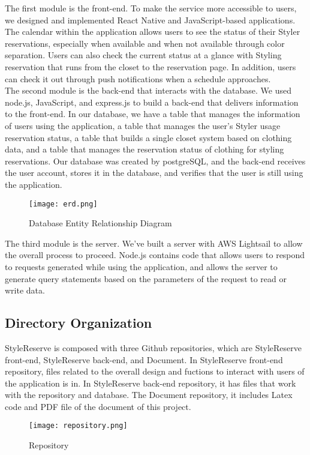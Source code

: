 \documentclass[conference]{IEEEtran}
\begin{document}
The first module is the front-end. To make the service more accessible to users, we designed and implemented React Native and JavaScript-based applications. The calendar within the application allows users to see the status of their Styler reservations, especially when available and when not available through color separation. Users can also check the current status at a glance with Styling reservation that runs from the closet to the reservation page. In addition, users can check it out through push notifications when a schedule approaches.\\
The second module is the back-end that interacts with the database. We used node.js, JavaScript, and express.js to build a back-end that delivers information to the front-end. In our database, we have a table that manages the information of users using the application, a table that manages the user's Styler usage reservation status, a table that builds a single closet system based on clothing data, and a table that manages the reservation status of clothing for styling reservations. Our database was created by postgreSQL, and the back-end receives the user account, stores it in the database, and verifies that the user is still using the application.\\

\begin{figure}[htbp]
\centerline{\texttt{[image: erd.png]}}
\label{fig}
\caption{Database Entity Relationship Diagram}
\end{figure}
The third module is the server. We've built a server with AWS Lightsail to allow the overall process to proceed. Node.js contains code that allows users to respond to requests generated while using the application, and allows the server to generate query statements based on the parameters of the request to read or write data.\\

\subsection{Directory Organization}
StyleReserve is composed with three Github repositories, which are StyleReserve front-end, StyleReserve back-end, and Document. In StyleReserve front-end repository, files related to the overall design and fuctions to interact with users of the application is in.
In StyleReserve back-end repository, it has files that work with the repository and database.
The Document repository, it includes Latex code and PDF file of the document of this project.
\begin{figure}[htbp]
\centerline{\texttt{[image: repository.png]}}
\label{fig}
\caption{Repository}
\end{figure}
\end{document}
